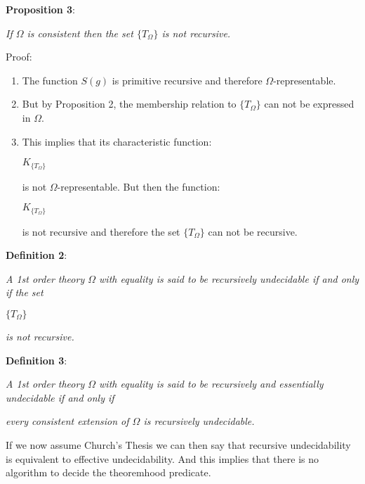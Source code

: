 \documentclass[12pt]{article}
\begin{document}
\textbf{Proposition 3}:

\begin{center} 
\emph{If $\Omega$ is consistent then the set $\{ T_{\Omega} \}$ is not recursive.}
\end{center}

Proof:
\begin{enumerate}
\item The function $S (g)$ is primitive recursive and therefore $\Omega$-representable.

\item But by Proposition 2, the membership relation to $\{ T_{\Omega} \}$ can not be expressed in $\Omega.$

\item This implies that its characteristic function:

\begin{center} 
$K_{\{ T_{\Omega} \}}$
\end{center}

is not $\Omega$-representable. But then the function:

\begin{center}
$K_{\{ T_{\Omega} \}}$
\end{center}

is not recursive and therefore the set $\{ T_{\Omega} \}$ can not be recursive.
\end{enumerate}

\textbf{Definition 2}:
           
\begin{center}
\emph{A 1st order theory $\Omega$ with equality is said to be recursively undecidable if and only if the set}
 
$\{ T_{\Omega} \}$

\emph{is not recursive.}
\end{center}

\textbf{Definition 3}: 

\begin{center}          
\emph{A 1st order theory $\Omega$ with equality is said to be recursively and essentially undecidable if and only if}

\emph{every consistent extension of $\Omega$ is recursively undecidable.}
\end{center}

If we now assume Church's Thesis we can then say that recursive undecidability is equivalent to effective undecidability. And this implies that there is no algorithm to decide the theoremhood predicate.
\end{document}
